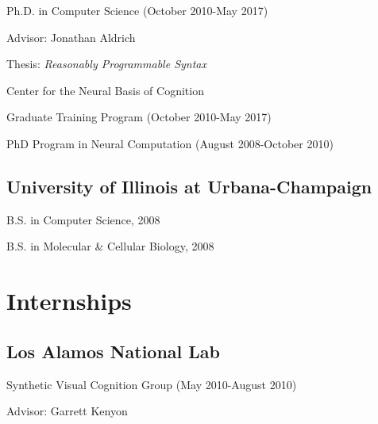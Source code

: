 \documentclass[10pt,letterpaper]{article}
\renewenvironment{itemize}{
  \begin{list}{}{
    \setlength{\leftmargin}{1.25em}
    \setlength{\itemsep}{0.25em}
    \setlength{\parskip}{0pt}
    \setlength{\parsep}{0.2em}
  }
}{
  \end{list}
}
\begin{document}
\begin{itemize}
  \item Ph.D. in Computer Science (October 2010-May 2017)
    \begin{itemize}
    \item Advisor: Jonathan Aldrich
    \item Thesis: \emph{Reasonably Programmable Syntax}
    \end{itemize}
  \item Center for the Neural Basis of Cognition
    \begin{itemize}
      \item Graduate Training Program (October 2010-May 2017)
      \item PhD Program in Neural Computation (August 2008-October 2010)
    \end{itemize}
\end{itemize}

\subsection*{University of Illinois at Urbana-Champaign}
\begin{itemize}
  \item B.S. in Computer Science, 2008
  \item B.S. in Molecular \& Cellular Biology, 2008
\end{itemize}


\section*{Internships}
\subsection*{Los Alamos National Lab}
  \begin{itemize}
    \item Synthetic Visual Cognition Group (May 2010-August 2010)
    \item Advisor: Garrett Kenyon
  \end{itemize}
\end{document}
